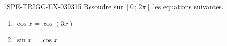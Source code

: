 \begin{exercice}{1SPE-TRIGO-EX-039}{3}{15}
Resoudre sur $[0\,;\,2\pi]$ les equations suivantes.
\begin{enumerate}
  \item $\cos x = \cos(3x)$
  \item $\sin x = \cos x$
\end{enumerate}
\end{exercice}
